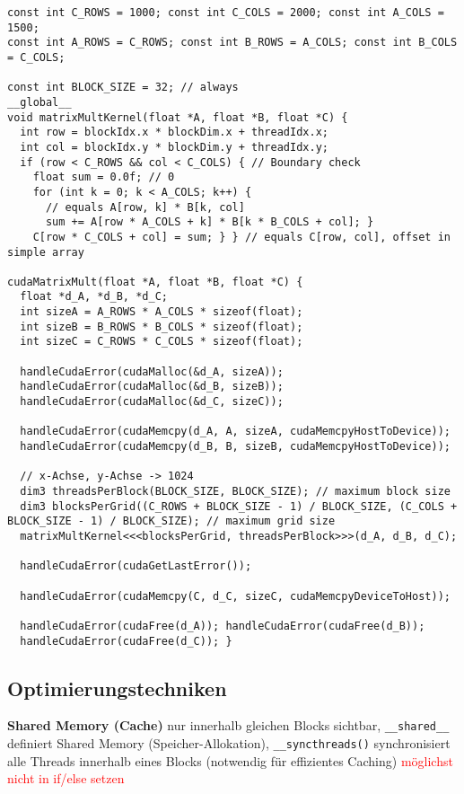 \begin{lstlisting}
const int C_ROWS = 1000; const int C_COLS = 2000; const int A_COLS = 1500;
const int A_ROWS = C_ROWS; const int B_ROWS = A_COLS; const int B_COLS = C_COLS;

const int BLOCK_SIZE = 32; // always
__global__
void matrixMultKernel(float *A, float *B, float *C) {
  int row = blockIdx.x * blockDim.x + threadIdx.x;
  int col = blockIdx.y * blockDim.y + threadIdx.y;
  if (row < C_ROWS && col < C_COLS) { // Boundary check
  	float sum = 0.0f; // 0
  	for (int k = 0; k < A_COLS; k++) {
  	  // equals A[row, k] * B[k, col]
      sum += A[row * A_COLS + k] * B[k * B_COLS + col]; }
  	C[row * C_COLS + col] = sum; } } // equals C[row, col], offset in simple array

cudaMatrixMult(float *A, float *B, float *C) {
  float *d_A, *d_B, *d_C;
  int sizeA = A_ROWS * A_COLS * sizeof(float);
  int sizeB = B_ROWS * B_COLS * sizeof(float);
  int sizeC = C_ROWS * C_COLS * sizeof(float);

  handleCudaError(cudaMalloc(&d_A, sizeA));
  handleCudaError(cudaMalloc(&d_B, sizeB));
  handleCudaError(cudaMalloc(&d_C, sizeC));

  handleCudaError(cudaMemcpy(d_A, A, sizeA, cudaMemcpyHostToDevice));
  handleCudaError(cudaMemcpy(d_B, B, sizeB, cudaMemcpyHostToDevice));

  // x-Achse, y-Achse -> 1024
  dim3 threadsPerBlock(BLOCK_SIZE, BLOCK_SIZE); // maximum block size
  dim3 blocksPerGrid((C_ROWS + BLOCK_SIZE - 1) / BLOCK_SIZE, (C_COLS + BLOCK_SIZE - 1) / BLOCK_SIZE); // maximum grid size
  matrixMultKernel<<<blocksPerGrid, threadsPerBlock>>>(d_A, d_B, d_C);

  handleCudaError(cudaGetLastError());

  handleCudaError(cudaMemcpy(C, d_C, sizeC, cudaMemcpyDeviceToHost));

  handleCudaError(cudaFree(d_A)); handleCudaError(cudaFree(d_B));
  handleCudaError(cudaFree(d_C)); }
\end{lstlisting}

\subsection{Optimierungstechniken}

\textbf{Shared Memory (Cache)} nur innerhalb gleichen Blocks sichtbar, \lstinline{__shared__} definiert Shared Memory (Speicher-Allokation), \lstinline{__syncthreads()} synchronisiert alle Threads innerhalb eines Blocks (notwendig für effizientes Caching) \textcolor{red}{möglichst nicht in if/else setzen}

